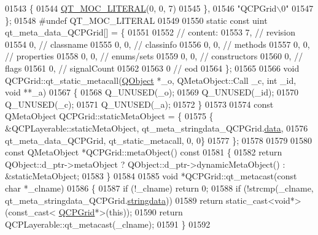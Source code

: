 \begin{DoxyCode}
01543     \{
01544 \hyperlink{a00067_a75bb9482d242cde0a06c9dbdc6b83abe}{QT\_MOC\_LITERAL}(0, 0, 7)
01545     \},
01546     \textcolor{stringliteral}{"QCPGrid\(\backslash\)0"}
01547 \};
01548 \textcolor{preprocessor}{#undef QT\_MOC\_LITERAL}
01549 
01550 \textcolor{keyword}{static} \textcolor{keyword}{const} uint qt\_meta\_data\_QCPGrid[] = \{
01551 
01552  \textcolor{comment}{// content:}
01553        7,       \textcolor{comment}{// revision}
01554        0,       \textcolor{comment}{// classname}
01555        0,    0, \textcolor{comment}{// classinfo}
01556        0,    0, \textcolor{comment}{// methods}
01557        0,    0, \textcolor{comment}{// properties}
01558        0,    0, \textcolor{comment}{// enums/sets}
01559        0,    0, \textcolor{comment}{// constructors}
01560        0,       \textcolor{comment}{// flags}
01561        0,       \textcolor{comment}{// signalCount}
01562 
01563        0        \textcolor{comment}{// eod}
01564 \};
01565 
01566 \textcolor{keywordtype}{void} QCPGrid::qt\_static\_metacall(\hyperlink{a00059}{QObject} *\_o, QMetaObject::Call \_c, \textcolor{keywordtype}{int} \_id, \textcolor{keywordtype}{void} **\_a)
01567 \{
01568     Q\_UNUSED(\_o);
01569     Q\_UNUSED(\_id);
01570     Q\_UNUSED(\_c);
01571     Q\_UNUSED(\_a);
01572 \}
01573 
01574 \textcolor{keyword}{const} QMetaObject QCPGrid::staticMetaObject = \{
01575     \{ &QCPLayerable::staticMetaObject, qt\_meta\_stringdata\_QCPGrid.\hyperlink{a00067_a7e6e5bd7ca3eb3f18073d11e635e5cb9}{data},
01576       qt\_meta\_data\_QCPGrid,  qt\_static\_metacall, 0, 0\}
01577 \};
01578 
01579 
01580 \textcolor{keyword}{const} QMetaObject *QCPGrid::metaObject()\textcolor{keyword}{ const}
01581 \textcolor{keyword}{}\{
01582     \textcolor{keywordflow}{return} QObject::d\_ptr->metaObject ? QObject::d\_ptr->dynamicMetaObject() : &staticMetaObject;
01583 \}
01584 
01585 \textcolor{keywordtype}{void} *QCPGrid::qt\_metacast(\textcolor{keyword}{const} \textcolor{keywordtype}{char} *\_clname)
01586 \{
01587     \textcolor{keywordflow}{if} (!\_clname) \textcolor{keywordflow}{return} 0;
01588     \textcolor{keywordflow}{if} (!strcmp(\_clname, qt\_meta\_stringdata\_QCPGrid.\hyperlink{a00067_a0bcd248c91a252f9ad93a353181ea07e}{stringdata}))
01589         \textcolor{keywordflow}{return} \textcolor{keyword}{static\_cast<}\textcolor{keywordtype}{void}*\textcolor{keyword}{>}(\textcolor{keyword}{const\_cast<} \hyperlink{a00030_de/df3/a00185}{QCPGrid}*\textcolor{keyword}{>}(\textcolor{keyword}{this}));
01590     \textcolor{keywordflow}{return} QCPLayerable::qt\_metacast(\_clname);
01591 \}
01592 

\end{DoxyCode}
